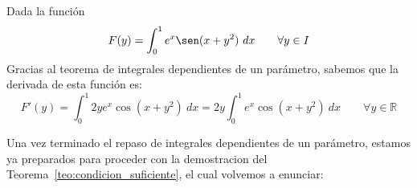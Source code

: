 \begin{ejemplo}
    Dada la función
    \begin{equation*}
        F(y) = \int_{0}^{1} e^x \sen(x+y^2)~dx \qquad \forall y\in I
    \end{equation*}
    Gracias al teorema de integrales dependientes de un parámetro, sabemos que la derivada de esta función es:
    \begin{equation*}
        F'(y) = \int_{0}^{1} 2ye^x \cos(x+y^2)~dx = 2y\int_{0}^{1} e^x \cos(x+y^2)~dx \qquad \forall y\in \mathbb{R}
    \end{equation*}
\end{ejemplo}

Una vez terminado el repaso de integrales dependientes de un parámetro, estamos ya preparados para proceder con la demostracion del Teorema~\ref{teo:condicion_suficiente}, el cual volvemos a enunciar:
